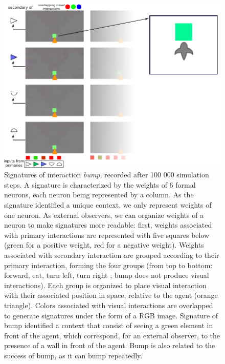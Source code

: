 \documentclass[conference]{IEEEtran}
\begin{document}
\begin{figure}[ht]
\centerline{\includegraphics[scale=0.45]{img/Signatures1_3.pdf}}
\caption{Signatures of interaction \textit{bump}, recorded after 100 000 simulation steps. A signature is characterized by the weights of 6 formal neurons, each neuron being represented by a column. As the signature identified a unique context, we only represent weights of one neuron. As external observers, we can organize weights of a neuron to make signatures more readable: first, weights associated with primary interactions are represented with five squares below (green for a positive weight, red for a negative weight). Weights associated with secondary interaction are grouped according to their primary interaction, forming the four groups (from top to bottom: forward, eat, turn left, turn right ; bump does not produce visual interactions). Each group is organized to place visual interaction with their associated position in space, relative to the agent (orange triangle). Colors associated with visual interactions are overlapped to generate signatures under the form of a RGB image. Signature of bump identified a context that consist of seeing a green element in front of the agent, which correspond, for an external observer, to the presence of a wall in front of the agent. Bump is also related to the success of bump, as it can bump repeatedly. %
}
\label{fig}
\end{figure}
\end{document}
